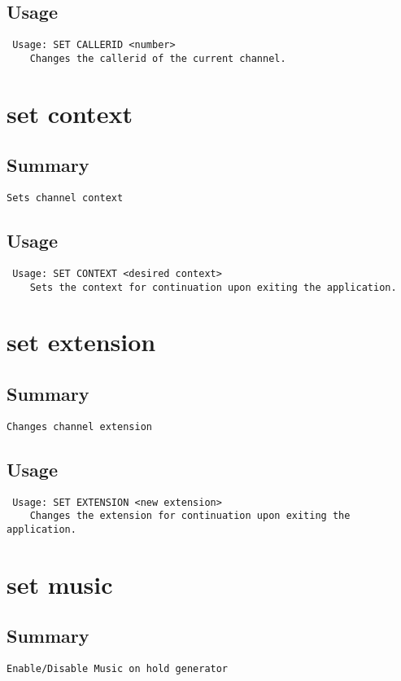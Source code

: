 \subsection{Usage}
\begin{verbatim}
 Usage: SET CALLERID <number>
	Changes the callerid of the current channel.

\end{verbatim}


\section{set context}
\subsection{Summary}
\begin{verbatim}
Sets channel context
\end{verbatim}
\subsection{Usage}
\begin{verbatim}
 Usage: SET CONTEXT <desired context>
	Sets the context for continuation upon exiting the application.

\end{verbatim}


\section{set extension}
\subsection{Summary}
\begin{verbatim}
Changes channel extension
\end{verbatim}
\subsection{Usage}
\begin{verbatim}
 Usage: SET EXTENSION <new extension>
	Changes the extension for continuation upon exiting the application.

\end{verbatim}


\section{set music}
\subsection{Summary}
\begin{verbatim}
Enable/Disable Music on hold generator
\end{verbatim}
